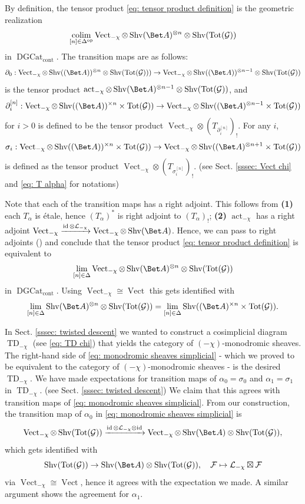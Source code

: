 \documentclass[10pt]{amsart}
\newcommand{\sssec}{\subsubsection}
\theoremstyle{remark}
\newcommand{\pa}{\partial}
\newcommand{\on}{\operatorname}
\newcommand{\cF}{\mathcal{F}}
\newcommand{\cG}{\mathcal{G}}
\newcommand{\cL}{\mathcal{L}}
\newcommand{\DGcat}{\on{DGCat}_{\on{cont}}}
\newcommand{\Vect}{\on{Vect}}
\newcommand{\Shv}{\on{Shv}}
\DeclareMathOperator{\op}{op}
\DeclareMathOperator{\colim}{colim}
\newcommand{\id}{\on{id}}
\begin{document}
\sssec{}
By definition, the tensor product \eqref{eq: tensor product definition} is the geometric realization
\[\colim_{[n]\in\Delta^{\op}}\Vect_{-\chi}\otimes \Shv(\Bet A)^{\otimes n}\otimes \Shv(\on{Tot}(\cG))\]
in $\DGcat$. The transition maps are as follows:
\[\pa_0: \Vect_{-\chi}\otimes \Shv((\Bet A))^{\otimes n}\otimes\Shv(\on{Tot}(\cG)))\rightarrow \Vect_{-\chi}\otimes \Shv((\Bet A))^{\otimes n-1}\otimes \Shv(\on{Tot}(\cG))\]
is the tensor product $\on{act}_{-\chi}\otimes \Shv(\Bet A)^{\otimes n-1}\otimes\Shv(\on{Tot}(\cG))$, and 
\[\pa^{[n]}_i: \Vect_{-\chi}\otimes \Shv((\Bet A))^{\times n}\times\on{Tot}(\cG))\rightarrow \Vect_{-\chi}\otimes \Shv((\Bet A)^{\otimes n-1}\times \on{Tot}(\cG)) \]
for $i> 0$ is defined to be the tensor product $\Vect_{-\chi}\otimes (T_{\pa^{[n]}_i})_{!}$. For any $i$,
\[\sigma_i:  \Vect_{-\chi}\otimes \Shv((\Bet A))^{\times n}\times\on{Tot}(\cG))\rightarrow \Vect_{-\chi}\otimes \Shv((\Bet A)^{\otimes n+1}\times \on{Tot}(\cG))\]
is defined as the tensor product $\Vect_{-\chi}\otimes (T_{\sigma^{[n]}_i})_{!}$. (see Sect. \ref{sssec: Vect chi} and \eqref{eq: T alpha} for notations)
\medskip

Note that each of the transition maps has a right adjoint. This follows from \textbf{(1)} each $T_{\alpha}$ is \'etale, hence $(T_{\alpha})^*$ is right adjoint to $(T_{\alpha})_!$; \textbf{(2)} $\on{act}_{-\chi}$ has a right adjoint $\Vect_{-\chi}\xrightarrow{\id\otimes \cL_{-\chi}}\Vect_{-\chi}\otimes \Shv(\Bet A)$. Hence, we can pass to right adjoints (\cite[Proposition 2.5.7]{GR}) and conclude that the tensor product \eqref{eq: tensor product definition} is equivalent to
\[\lim_{[n]\in\Delta} \Vect_{-\chi}\otimes \Shv(\Bet A)^{\otimes n} \otimes \Shv(\on{Tot}(\cG))\]
in $\DGcat$. Using $\Vect_{-\chi}\cong \Vect$ this gets identified with
\begin{equation}\label{eq: monodromic sheaves simplicial}
    \lim_{[n]\in\Delta} \Shv(\Bet A)^{\otimes n} \otimes \Shv(\on{Tot}(\cG)) =\lim_{[n]\in\Delta}\Shv((\Bet A)^{\times n}\times \on{Tot}(\cG)).
\end{equation}

In Sect. \ref{sssec: twisted descent} we wanted to construct a cosimplicial diagram $\on{TD}_{-\chi}$ (see \eqref{eq: TD chi}) that yields the category of $(-\chi)$-monodromic sheaves. The right-hand side of \eqref{eq: monodromic sheaves simplicial} - which we proved to be equivalent to the category of $(-\chi)$-monodromic sheaves - is the desired $\on{TD}_{-\chi}$. 
We have made expectations for transition maps of $\alpha_0=\sigma_0$ and $\alpha_1=\sigma_1$ in $\on{TD}_{-\chi}$. (see Sect. \ref{sssec: twisted descent}) We claim that this agrees with transition maps of \eqref{eq: monodromic sheaves simplicial}. From our construction, the transition map of $\alpha_0$ in \eqref{eq: monodromic sheaves simplicial} is 
\[\Vect_{-\chi}\otimes\Shv(\on{Tot}(\cG))\xrightarrow{\id\otimes \cL_{-\chi}\otimes\id} \Vect_{-\chi}\otimes\Shv(\Bet A)\otimes \Shv(\on{Tot}(\cG)),\]
which gets identified with
\[\Shv(\on{Tot}(\cG))\rightarrow \Shv(\Bet A)\otimes \Shv(\on{Tot}(\cG)),\quad \cF\mapsto \cL_{-\chi}\boxtimes \cF\]
via $\Vect_{-\chi}\cong\Vect$, hence it agrees with the expectation we made. A similar argument shows the agreement for $\alpha_1$.
    
\end{document}
